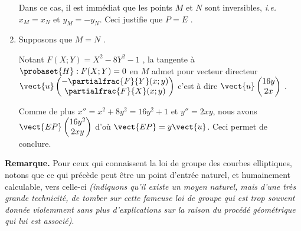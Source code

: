 \begin{enumerate}
	\smallskip
	
	\noindent
	Dans ce cas, il est immédiat que les points $M$ et $N$ sont inversibles, \emph{i.e.} $x_M = x_N$ et $y_M = -y_N$.
	Ceci justifie que $P = E$ .


	\medskip
	\item Supposons que $M = N$ .
	
	\smallskip
	
	\noindent
	Notant $F(X ; Y) = X^2 - 8 Y^2 - 1$ , la tangente à $\probaset{H} : F(X ; Y) = 0$ en $M$ admet pour vecteur directeur
	$\vect{u} \begin{pmatrix} 
	  - \partialfrac{F}{Y}(x ; y)    \\ 
	  \partialfrac{F}{X}(x ; y) 
	\end{pmatrix}$
	c'est à dire
	$\vect{u} \begin{pmatrix} 
	  16y    \\ 
	  2x 
	\end{pmatrix}$
	. 
	
	
	\noindent
	Comme de plus $x'' = x^2 + 8y^2 = 16y^2 + 1$ et $y'' = 2xy$, nous avons
	$\vect{EP} \begin{pmatrix} 
	  16y^2    \\ 
	  2xy
	\end{pmatrix}$
	d'où
	$\vect{EP} = y \vect{u}$.
	Ceci permet de conclure.
\end{enumerate}



\bigskip

\textbf{Remarque.} Pour ceux qui connaissent la loi de groupe des courbes elliptiques, notons que ce qui précède peut être un point d'entrée naturel, et humainement calculable, vers celle-ci \textit{(indiquons qu'il existe un moyen naturel, mais d'une très grande technicité, de tomber sur cette fameuse loi de groupe qui est trop souvent donnée violemment sans plus d'explications sur la raison du procédé géométrique qui lui est associé)}.